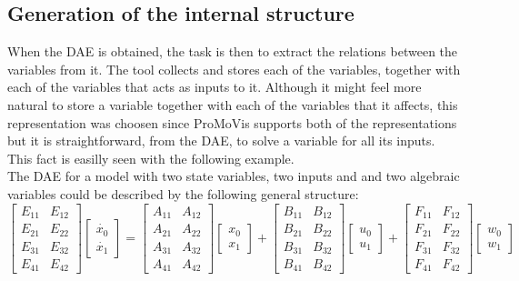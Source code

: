 \subsection{Generation of the internal structure}
When the DAE is obtained, the task is then to extract the relations between the variables from it. The tool collects and stores each of the variables, together with each of the variables that acts as inputs to it. Although it might feel more natural to store a variable together with each of the variables that it affects, this representation was choosen since ProMoVis supports both of the representations but it is straightforward, from the DAE, to solve a variable for all its inputs.\\\newline
This fact is easilly seen with the following example.\\\newline
The DAE for a model with two state variables, two inputs and and two algebraic variables could be described by the following general structure:
%
\begin{equation}\begin{bmatrix} E_{11} & E_{12} \\ E_{21} & E_{22} \\ E_{31} & E_{32} \\ E_{41} & E_{42} \end{bmatrix} \left[ \begin{array}{c} \dot{x_0} \\ \dot{x_1} \end{array} \right] = \begin{bmatrix} A_{11} & A_{12} \\ A_{21} & A_{22} \\ A_{31} & A_{32} \\ A_{41} & A_{42} \end{bmatrix} \left[ \begin{array}{c} x_0 \\ x_1 \end{array} \right] + \begin{bmatrix} B_{11} & B_{12} \\ B_{21} & B_{22} \\ B_{31} & B_{32} \\ B_{41} & B_{42} \end{bmatrix} \left[ \begin{array}{c} u_0 \\ u_1 \end{array} \right]+\begin{bmatrix} F_{11} & F_{12} \\ F_{21} & F_{22} \\ F_{31} & F_{32} \\ F_{41} & F_{42}\end{bmatrix} \left[ \begin{array}{c} w_0 \\ w_1 \end{array} \right]\end{equation}
